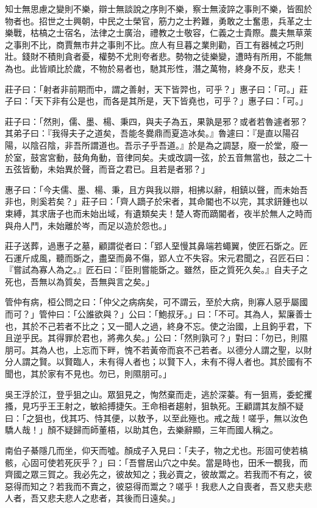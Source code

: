 \begin{pinyinscope}
知士無思慮之變則不樂，辯士無談說之序則不樂，察士無淩誶之事則不樂，皆囿於物者也。招世之士興朝，中民之士榮官，筋力之士矜難，勇敢之士奮患，兵革之士樂戰，枯槁之士宿名，法律之士廣治，禮教之士敬容，仁義之士貴際。農夫無草萊之事則不比，商賈無市井之事則不比。庶人有旦暮之業則勸，百工有器械之巧則壯。錢財不積則貪者憂，權勢不尤則夸者悲。勢物之徒樂變，遭時有所用，不能無為也。此皆順比於歲，不物於易者也，馳其形性，潛之萬物，終身不反，悲夫！

莊子曰：「射者非前期而中，謂之善射，天下皆羿也，可乎？」惠子曰：「可。」莊子曰：「天下非有公是也，而各是其所是，天下皆堯也，可乎？」惠子曰：「可。」

莊子曰：「然則，儒、墨、楊、秉四，與夫子為五，果孰是邪？或者若魯遽者邪？其弟子曰：『我得夫子之道矣，吾能冬爨鼎而夏造冰矣。』魯遽曰：『是直以陽召陽，以陰召陰，非吾所謂道也。吾示子乎吾道。』於是為之調瑟，廢一於堂，廢一於室，鼓宮宮動，鼓角角動，音律同矣。夫或改調一弦，於五音無當也，鼓之二十五弦皆動，未始異於聲，而音之君已。且若是者邪？」

惠子曰：「今夫儒、墨、楊、秉，且方與我以辯，相拂以辭，相鎮以聲，而未始吾非也，則奚若矣？」莊子曰：「齊人蹢子於宋者，其命閽也不以完，其求鈃鍾也以束縛，其求唐子也而未始出域，有遺類矣夫！楚人寄而蹢閽者，夜半於無人之時而與舟人鬥，未始離於岑，而足以造於怨也。」

莊子送葬，過惠子之墓，顧謂從者曰：「郢人堊慢其鼻端若蠅翼，使匠石斲之。匠石運斤成風，聽而斲之，盡堊而鼻不傷，郢人立不失容。宋元君聞之，召匠石曰：『嘗試為寡人為之。』匠石曰：『臣則嘗能斲之。雖然，臣之質死久矣。』自夫子之死也，吾無以為質矣，吾無與言之矣。」

管仲有病，桓公問之曰：「仲父之病病矣，可不謂云，至於大病，則寡人惡乎屬國而可？」管仲曰：「公誰欲與？」公曰：「鮑叔牙。」曰：「不可。其為人，絜廉善士也，其於不己若者不比之；又一聞人之過，終身不忘。使之治國，上且鉤乎君，下且逆乎民。其得罪於君也，將弗久矣。」公曰：「然則孰可？」對曰：「勿已，則隰朋可。其為人也，上忘而下畔，愧不若黃帝而哀不己若者。以德分人謂之聖，以財分人謂之賢。以賢臨人，未有得人者也；以賢下人，未有不得人者也。其於國有不聞也，其於家有不見也。勿已，則隰朋可。」

吳王浮於江，登乎狙之山。眾狙見之，恂然棄而走，逃於深蓁。有一狙焉，委蛇攫搔，見巧乎王王射之，敏給搏捷矢。王命相者趨射，狙執死。王顧謂其友顏不疑曰：「之狙也，伐其巧、恃其便，以敖予，以至此殛也。戒之哉！嗟乎，無以汝色驕人哉！」顏不疑歸而師董梧，以助其色，去樂辭顯，三年而國人稱之。

南伯子綦隱几而坐，仰天而噓。顏成子入見曰：「夫子，物之尤也。形固可使若槁骸，心固可使若死灰乎？」曰：「吾嘗居山穴之中矣。當是時也，田禾一覩我，而齊國之眾三賀之。我必先之，彼故知之；我必賣之，彼故鬻之。若我而不有之，彼惡得而知之？若我而不賣之，彼惡得而鬻之？嗟乎！我悲人之自喪者，吾又悲夫悲人者，吾又悲夫悲人之悲者，其後而日遠矣。」


\end{pinyinscope}
